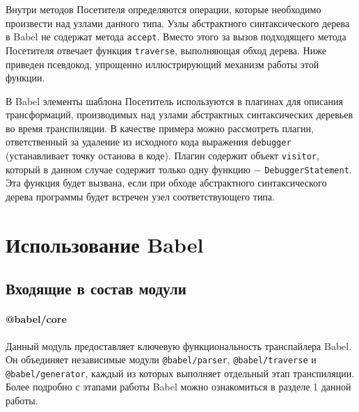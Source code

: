 \documentclass[14pt, a4paper]{article}
\def\code#1{\texttt{#1}} %
\begin{document}
Внутри методов Посетителя определяются операции, которые необходимо произвести над узлами данного типа.
Узлы абстрактного синтаксического дерева в Babel не содержат метода \code{accept}. Вместо этого за вызов
подходящего метода Посетителя отвечает функция \code{traverse}, выполняющая обход дерева. Ниже приведен 
псевдокод, упрощенно иллюстрирующий механизм работы этой функции.




В Babel элементы шаблона Посетитель используются в плагинах для описания трансформаций, производимых 
над узлами абстрактных синтаксических деревьев во время транспиляции. В качестве примера можно рассмотреть 
плагин, ответственный за удаление из исходного кода выражения \code{debugger} (устанавливает точку 
останова в коде). Плагин содержит объект \code{visitor}, который в данном случае содержит только одну 
функцию $-$ \linebreak \code{DebuggerStatement}. Эта функция будет вызвана, если при обходе абстрактного 
синтаксического дерева программы будет встречен узел соответствующего типа.  



\pagebreak

\section{Использование Babel}
\subsection{Входящие в состав модули}
\paragraph{@babel/core} \mbox{}

Данный модуль предоставляет ключевую функциональность транспайлера Babel. Он объединяет независимые 
модули \code{@babel/parser}, \linebreak \code{@babel/traverse} и \code{@babel/generator}, каждый из которых 
выполняет отдельный этап транспиляции. Более подробно с этапами работы Babel можно ознакомиться 
в разделе 1 данной работы.
\end{document}

